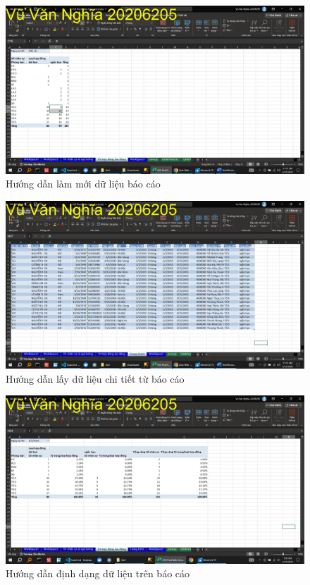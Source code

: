 \documentclass{article}
\begin{document}
\begin{figure}[H]
    \centering
    \includegraphics[scale = 0.15]{Bai1/HuongDan/2.png}
    \caption{Hướng dẫn làm mới dữ liệu báo cáo}
\end{figure}



\begin{figure}[H]
    \centering
    \includegraphics[scale = 0.15]{Bai1/HuongDan/3.png}
    \caption{Hướng dẫn lấy dữ liệu chi tiết từ báo cáo}
\end{figure}



\begin{figure}[H]
    \centering
    \includegraphics[scale = 0.15]{Bai1/HuongDan/4.png}
    \caption{Hướng dẫn định dạng dữ liệu trên báo cáo}
\end{figure}
\end{document}
